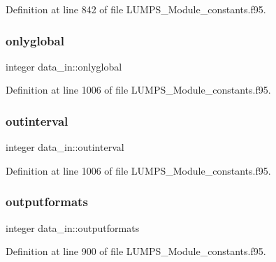 Definition at line 842 of file L\+U\+M\+P\+S\+\_\+\+Module\+\_\+constants.\+f95.

\mbox{\label{namespacedata__in_aa01c62f4d3c77eccd73d51c81438ac1a}} 
\subsubsection{\texorpdfstring{onlyglobal}{onlyglobal}}
{\footnotesize\ttfamily integer data\+\_\+in\+::onlyglobal}



Definition at line 1006 of file L\+U\+M\+P\+S\+\_\+\+Module\+\_\+constants.\+f95.

\mbox{\label{namespacedata__in_aa192321c93659ded79b2485baaa901b3}} 
\subsubsection{\texorpdfstring{outinterval}{outinterval}}
{\footnotesize\ttfamily integer data\+\_\+in\+::outinterval}



Definition at line 1006 of file L\+U\+M\+P\+S\+\_\+\+Module\+\_\+constants.\+f95.

\mbox{\label{namespacedata__in_afeae0c4bf24c4eea3af4a7fded472b26}} 
\subsubsection{\texorpdfstring{outputformats}{outputformats}}
{\footnotesize\ttfamily integer data\+\_\+in\+::outputformats}



Definition at line 900 of file L\+U\+M\+P\+S\+\_\+\+Module\+\_\+constants.\+f95.

\mbox{\label{namespacedata__in_a444b978c1a82b3eac7148ef35e9769c9}} 
